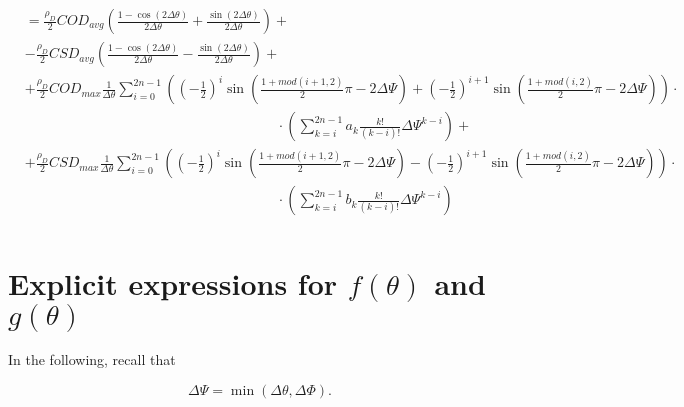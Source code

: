 \documentclass[review]{elsarticle}
\begin{document}
\begin{enumerate}
\begin{equation}
\begin{aligned}
&=\frac{\rho_{D}}{2}COD_{avg}\left(\frac{1-\cos\left(2\Delta\theta\right)}{2\Delta\theta}+\frac{\sin\left(2\Delta\theta\right)}{2\Delta\theta}\right)+\\
&-\frac{\rho_{D}}{2}CSD_{avg}\left(\frac{1-\cos\left(2\Delta\theta\right)}{2\Delta\theta}-\frac{\sin\left(2\Delta\theta\right)}{2\Delta\theta}\right)+\\
&+\frac{\rho_{D}}{2}COD_{max}\frac{1}{\Delta\theta}\sum_{i=0}^{2n-1}\left(\left(-\frac{1}{2}\right)^{i}\sin\left(\frac{1+mod\left(i+1,2\right)}{2}\pi-2\Delta\Psi\right)+\left(-\frac{1}{2}\right)^{i+1}\sin\left(\frac{1+mod\left(i,2\right)}{2}\pi-2\Delta\Psi\right)\right)\cdot\\&\qquad\qquad\qquad\qquad\qquad\qquad\qquad\qquad\qquad\cdot\left(\sum_{k=i}^{2n-1}a_{k}\frac{k!}{\left(k-i\right)!}\Delta\Psi^{k-i}\right)+\\
&+\frac{\rho_{D}}{2}CSD_{max}\frac{1}{\Delta\theta}\sum_{i=0}^{2n-1}\left(\left(-\frac{1}{2}\right)^{i}\sin\left(\frac{1+mod\left(i+1,2\right)}{2}\pi-2\Delta\Psi\right)-\left(-\frac{1}{2}\right)^{i+1}\sin\left(\frac{1+mod\left(i,2\right)}{2}\pi-2\Delta\Psi\right)\right)\cdot\\&\qquad\qquad\qquad\qquad\qquad\qquad\qquad\qquad\qquad\cdot\left(\sum_{k=i}^{2n-1}b_{k}\frac{k!}{\left(k-i\right)!}\Delta\Psi^{k-i}\right)\\
\end{aligned}
\end{equation}

\end{enumerate}



\appendix
\section{Explicit expressions for $f\left(\theta\right)$ and $g\left(\theta\right)$}\label{app:fandgexplicit}

In the following, recall that

\begin{equation}
\Delta\Psi=\min\left(\Delta\theta,\Delta\Phi\right).
\end{equation}
\end{document}
